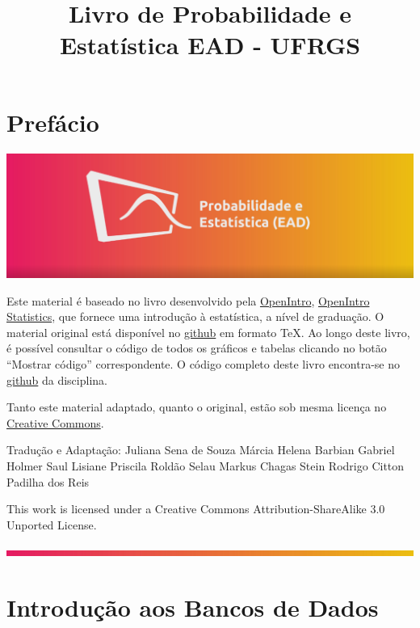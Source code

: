 \documentclass[
]{book}
\title{Livro de Probabilidade e Estatística EAD - UFRGS}
\author{}
\date{\vspace{-2.5em}}
\theoremstyle{definition}
\theoremstyle{definition}
\theoremstyle{definition}
\theoremstyle{definition}
\theoremstyle{remark}
\begin{document}
\maketitle

{
\setcounter{tocdepth}{1}
\tableofcontents
}
\hypertarget{prefuxe1cio}{%
\chapter*{Prefácio}\label{prefuxe1cio}}

\includegraphics{images/imagem_site_disciplina.png}

Este material é baseado no livro desenvolvido pela \href{https://www.openintro.org/}{OpenIntro}, \href{https://leanpub.com/openintro-statistics}{OpenIntro Statistics}, que fornece uma introdução à estatística, a nível de graduação. O material original está disponível no \href{https://github.com/OpenIntroStat/openintro-statistics}{github} em formato TeX. Ao longo deste livro, é possível consultar o código de todos os gráficos e tabelas clicando no botão ``Mostrar código'' correspondente. O código completo deste livro encontra-se no \href{https://github.com/Probabilidade-e-Estatistica-EAD/livro2}{github} da disciplina.

Tanto este material adaptado, quanto o original, estão sob mesma licença no \href{https://creativecommons.org/}{Creative Commons}.

Tradução e Adaptação: Juliana Sena de Souza Márcia Helena Barbian Gabriel Holmer Saul Lisiane Priscila Roldão Selau Markus Chagas Stein Rodrigo Citton Padilha dos Reis

This work is licensed under a Creative Commons Attribution-ShareAlike 3.0 Unported License.

\includegraphics{images/before_site_disciplina.png}

\hypertarget{ch1-intro}{%
\chapter{Introdução aos Bancos de Dados}\label{ch1-intro}}
\end{document}
